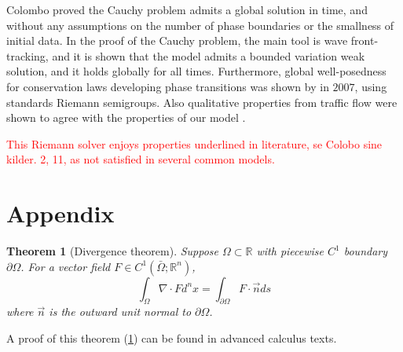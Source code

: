 \documentclass[10pt]{article}
\newtheorem{theorem}{Theorem}[section]
\numberwithin{equation}{section}
\begin{document}
Colombo proved the Cauchy problem admits a global solution in time, and without any assumptions on the number of phase boundaries or the smallness of initial data. In the proof of the Cauchy problem, the main tool is wave front-tracking, and it is shown that the model admits a bounded variation weak solution, and it holds globally for all times. Furthermore, global well-posedness for conservation laws developing phase transitions was shown by \cite{ColomboGoatinPriuli} in $2007$, using standards Riemann semigroups. 
Also qualitative properties from traffic flow were shown to agree with the properties of our model \cite{Colombo2003}.   

\textcolor{red}{This Riemann solver enjoys properties underlined in literature, se Colobo sine kilder. 2, 11, as not satisfied in several common models.}





\newpage

\appendix
\section{Appendix}

\begin{theorem}[Divergence theorem]
Suppose $\Omega \subset \mathbb{R}$ with piecewise $C^1$ boundary $\partial \Omega$. For a vector field $F \in C^1(\bar \Omega; \mathbb{R}^n)$, 
\begin{equation}
    \int_\Omega \nabla \cdot F d^nx = \int_{\partial \Omega} F \cdot \vec{n} ds
\end{equation}
where $\vec{n} $ is the outward unit normal to $\partial \Omega$.
\label{Thm:Divergence}
\end{theorem}
A proof of this theorem (\ref{Thm:Divergence}) can be found in advanced calculus texts. 


\newpage
\printbibliography
\end{document}
